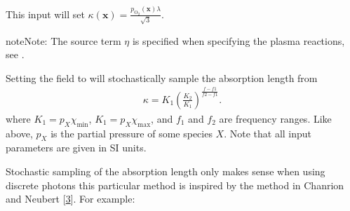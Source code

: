 \documentclass[letterpaper,10pt,english]{sphinxmanual}
\begin{document}
\begin{sphinxVerbatim}[commandchars=\\\{\},formatcom=\scriptsize]
   \PYG{p}{[}
        
        
        
        
   \PYG{p}{]}
\end{sphinxVerbatim}

This input will set \(\kappa\left(\mathbf{x}\right) = \frac{p_{\textrm{O}_2}\left(\mathbf{x}\right)\lambda}{\sqrt{3}}\).

\begin{sphinxadmonition}{note}{Note:}
The source term \(\eta\) is specified when specifying the plasma reactions, see {\hyperref[\detokenize{Applications/CdrPlasmaModel:chap-cdrplasmareactionsjson}]{}}.
\end{sphinxadmonition}


Setting the  field to  will stochastically sample the absorption length from
\begin{equation*}
\begin{split}\kappa = K_1 \left(\frac{K_2}{K_1}\right)^{\frac{f-f1}{f2-f1}}.\end{split}
\end{equation*}
where \(K_1 = p_X\chi_{\textrm{min}}\), \(K_1 = p_X\chi_{\textrm{max}}\), and \(f_1\) and \(f_2\) are frequency ranges.
Like above, \(p_X\) is the partial pressure of some species \(X\).
Note that all input parameters are given in SI units.

Stochastic sampling of the absorption length only makes sense when using discrete photons \textendash{} this particular method is inspired by the method in Chanrion and Neubert {[}\hyperlink{cite.ZZReferences:id163}{3}{]}.
For example:
\end{document}
